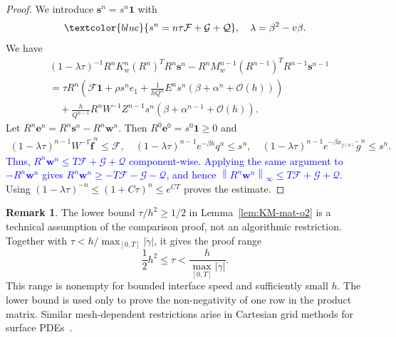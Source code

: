 \documentclass[11pt,reqno]{amsart}
\theoremstyle{plain}
\theoremstyle{definition}
\newtheorem{remark}[theorem]{Remark}
\numberwithin{equation}{section}
\newcommand{\paren}[1]{\left(#1\right)}
\newcommand{\mc}[1]{\mathcal{#1}}
\newcommand{\wt}[1]{\widetilde{#1}}
\newcommand{\bm}[1]{\boldsymbol{#1}}
\newcommand{\norm}[1]{\left\lVert #1 \right\rVert}
\begin{document}
\begin{proof}
We introduce $\bm s^n = s^n\bm 1$ with
\begin{equation}
    \textcolor{blue}{s^n=n\tau\mathcal F+\mathcal G+\mathcal Q},
    \quad \lambda = \beta^2-v\beta.
\end{equation}
We have
\begin{equation}
\begin{aligned}
    &(1-\lambda \tau)^{-1} R^n K_w^n (R^n)^T R^n \bm s^n -  R^n M_w^{n-1} (R^{n-1})^T R^{n-1} \bm s^{n-1} \\
    &= \tau R^n \paren{ \mathcal{F}\bm 1 + \rho s^n e_1
    + \frac{1}{hQ^n}E^n  s^n (\beta+\alpha^n+\mc O(h))} \\
    &\quad + \frac{h}{Q^{n-1}}R^nW^{-1}Z^{n-1}
    s^n \paren{\beta+\alpha^{n-1}+\mc O(h)}.
\end{aligned}
\end{equation}
Let $R^n\bm e^n = R^n\bm s^n - R^n\bm w^n$. Then $R^0\bm e^0 = s^0\bm 1 \ge 0$ and
\begin{equation}
\begin{aligned}
    (1-\lambda\tau)^{n-1}W^{-1}\wt{\bm f}^n \le \mathcal{F},\quad
    (1-\lambda\tau)^{n-1}e^{-\beta h}q^n\le s^n,\quad
    (1-\lambda\tau)^{n-1}e^{-\beta x_{j(n)}}\wt g^n \le s^n.
\end{aligned}
\end{equation}
\textcolor{blue}{Thus,
$R^n\bm w^n\le T\mathcal F+\mathcal G+\mathcal Q$ component-wise.
Applying the same argument to $-R^n\bm w^n$ gives
$R^n\bm w^n\ge-T\mathcal F-\mathcal G-\mathcal Q$, and hence
$\norm{R^n\bm w^n}_\infty\le T\mathcal F+\mathcal G+\mathcal Q$.}
Using $(1-\lambda\tau)^{-n} \le  \paren{1+C\tau}^n \le e^{CT}$ proves the estimate.
\end{proof}

\begin{remark}
The lower bound $\tau/h^2\ge 1/2$ in Lemma~\ref{lem:KM-mat-o2} is a technical
assumption of the comparison proof, not an algorithmic restriction. Together
with $\tau<h/\max_{[0,T]}|\dot\gamma|$, it gives the proof range
\begin{equation}
\frac12 h^2\le \tau < \frac{h}{\max_{[0,T]}|\dot\gamma|}.
\end{equation}
This range is nonempty for bounded interface speed and sufficiently small $h$.
The lower bound is used only to prove the non-negativity of one row in the
product matrix. 
Similar mesh-dependent restrictions arise in Cartesian grid methods for
surface PDEs~\cite{Beale2020_SINUM}.
\end{remark}
\end{document}
